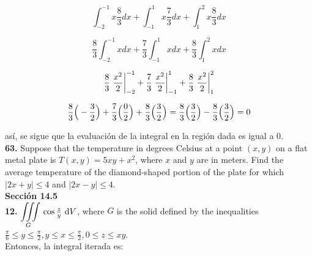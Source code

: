 \documentclass[11pt]{report}
\begin{document}
	$$ \int_{-2}^{-1} x \frac{8}{3} dx +
		\int_{-1}^{1} x \frac{7}{3} dx +
		\int_{1}^{2} x \frac{8}{3} dx $$

	$$  \frac{8}{3} \int_{-2}^{-1} x dx +
		\frac{7}{3} \int_{-1}^{1} x  dx +
		\frac{8}{3} \int_{1}^{2} x  dx $$

	$$  \frac{8}{3} \left.\frac{x^2}{2}\right\rvert_{-2}^{-1} +
		\frac{7}{3} \left.\frac{x^2}{2}\right\rvert_{-1}^{1} +
		\frac{8}{3} \left.\frac{x^2}{2}\right\rvert_{1}^{2} $$

	$$  \frac{8}{3} \Big( - \frac{3}{2} \Big) +
		\frac{7}{3} \Big( \frac{0}{2} \Big) +
		\frac{8}{3} \Big( \frac{3}{2} \Big) =
		\frac{8}{3} \Big( \frac{3}{2} \Big) - \frac{8}{3} \Big( \frac{3}{2} \Big) = 0 $$

así, se sigue que la evaluación de la integral en la región dada es igual a $0$.\\

\textbf{63.} Suppose that the temperature in degrees Celsius at a point $(x, y)$
on a flat metal plate is $T(x, y) = 5xy + x^2 $, where $x$ and $y$ are in meters.
Find the average temperature of the diamond-shaped portion of the plate for which
$|2x + y| \leq 4$ and $|2x - y| \leq 4$. \\

\textbf{Sección 14.5} \\

\textbf{12.} $ {\displaystyle \iiint \limits_G } \, \cos{\frac{z}{y}} \, \, \text dV $,
where $G$ is the solid defined by the inequalities
$\frac{\pi}{6} \leq y \leq \frac{\pi}{2}, y \leq x \leq \frac{\pi}{2}, 0 \leq z \leq xy$. \\

Entonces, la integral iterada es:
\end{document}
